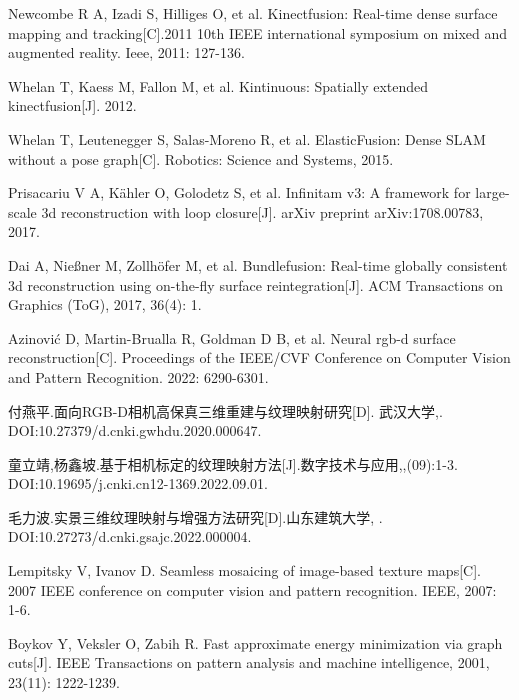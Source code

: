 
 Newcombe R A, Izadi S, Hilliges O, et al. Kinectfusion: Real-time dense surface mapping and tracking[C].2011 10th IEEE international symposium on mixed and augmented reality. Ieee, 2011: 127-136.

Whelan T, Kaess M, Fallon M, et al. Kintinuous: Spatially extended kinectfusion[J]. 2012.
                  
Whelan T, Leutenegger S, Salas-Moreno R, et al. ElasticFusion: Dense SLAM without a pose graph[C]. Robotics: Science and Systems, 2015.


 Prisacariu V A, Kähler O, Golodetz S, et al. Infinitam v3: A framework for large-scale 3d reconstruction with loop closure[J]. arXiv preprint arXiv:1708.00783, 2017.

Dai A, Nießner M, Zollhöfer M, et al. Bundlefusion: Real-time globally consistent 3d reconstruction using on-the-fly surface reintegration[J]. ACM Transactions on Graphics (ToG), 2017, 36(4): 1.

 Azinović D, Martin-Brualla R, Goldman D B, et al. Neural rgb-d surface reconstruction[C]. Proceedings of the IEEE/CVF Conference on Computer Vision and Pattern Recognition. 2022: 6290-6301.

付燕平.\enspace 面向RGB-D相机高保真三维重建与纹理映射研究[D]. \enspace 武汉大学,. DOI:10.27379/d.cnki.gwhdu.2020.000647.
 
童立靖,\enspace 杨鑫坡.\enspace 基于相机标定的纹理映射方法[J].数字技术与应用,,(09):1-3. DOI:10.19695/j.cnki.cn12-1369.2022.09.01.

毛力波.\enspace 实景三维纹理映射与增强方法研究[D].\enspace 山东建筑大学, . \enspace DOI:10.27273/d.cnki.gsajc.2022.000004.

Lempitsky V, Ivanov D. Seamless mosaicing of image-based texture maps[C]. 2007 IEEE conference on computer vision and pattern recognition. IEEE, 2007: 1-6.


Boykov Y, Veksler O, Zabih R. Fast approximate energy minimization via graph cuts[J]. IEEE Transactions on pattern analysis and machine intelligence, 2001, 23(11): 1222-1239.

